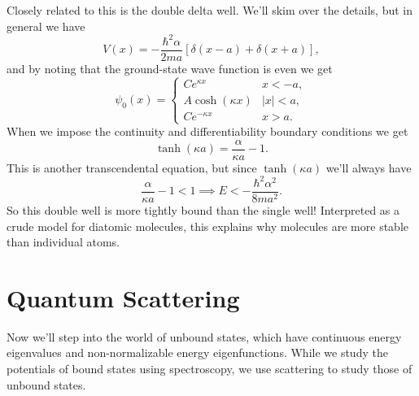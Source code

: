 \documentclass[../p052main.tex]{subfiles}
\begin{document}
Closely related to this is the double delta well.
We'll skim over the details, but in general we have
\[ V(x) = -\frac{\hbar^2 \alpha}{2ma} \left[ \delta (x-a) + \delta (x+a) \right], \]
and by noting that the ground-state wave function is even we get
\[ \psi_0(x) = \begin{cases} Ce^{\kappa x} & x < -a, \\ A \cosh (\kappa x) & |x| < a, \\ Ce^{-\kappa x} & x > a. \end{cases} \]
When we impose the continuity and differentiability boundary conditions we get
\[ \tanh (\kappa a) = \frac{\alpha}{\kappa a} - 1. \]
This is another transcendental equation, but since $\tanh (\kappa a)$ we'll always have
\[ \frac{\alpha}{\kappa a} - 1 < 1 \implies E < -\frac{\hbar^2 \alpha^2}{8ma^2}. \]
So this double well is more tightly bound than the single well!
Interpreted as a crude model for diatomic molecules, this explains why molecules are more stable than individual atoms.


\section{Quantum Scattering}
Now we'll step into the world of unbound states, which have continuous energy eigenvalues and non-normalizable energy eigenfunctions.
While we study the potentials of bound states using spectroscopy, we use scattering to study those of unbound states.
\end{document}
